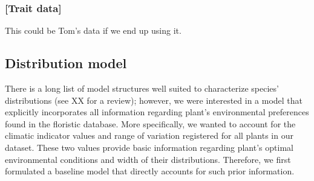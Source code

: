 \documentclass[11pt, a4paper]{article}
\begin{document}
{\color{gray}
\subsubsection*{[Trait data]}
This could be Tom's data if we end up using it.}

\subsection*{Distribution model}
There is a long list of model structures well suited to characterize species' distributions (see XX for a review); however, we were interested in a model that explicitly incorporates all information regarding plant's environmental preferences found in the floristic database. More specifically, we wanted to account for the climatic indicator values and range of variation registered for all plants in our dataset. These two values provide basic information regarding plant's optimal environmental conditions and width of their distributions. Therefore, we first formulated a baseline model that directly accounts for such prior information. 
\end{document}
